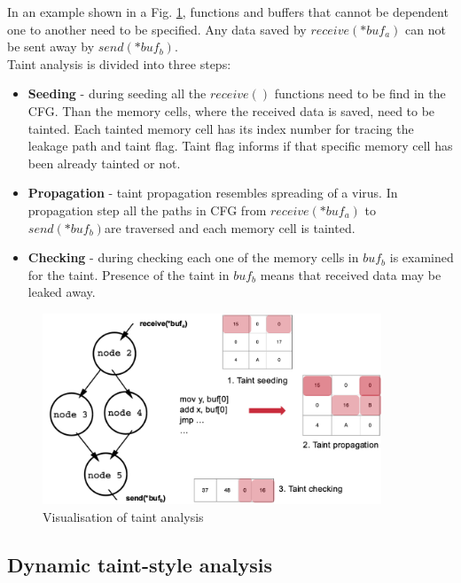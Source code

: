 \documentclass[a4paper, 12pt, journal, onecolumn]{IEEEtran}
\begin{document}
In an example shown in a Fig. \ref{fig:taint}, functions and buffers that cannot be dependent one to another need to be specified. Any data saved by $receive(*buf_a)$ can not be sent away by $send(*buf_b)$. 
\\

Taint analysis is divided into three steps:\\
\begin{itemize}
\item \textbf{Seeding} - during seeding all the $receive()$ functions need to be find in the CFG. Than the memory cells, where the received data is saved, need to be tainted. Each tainted memory cell has its index number for tracing the leakage path and taint flag. Taint flag informs if that specific memory cell has been already tainted or not.\\
\item \textbf{Propagation} - taint propagation resembles spreading of a virus. In propagation step all the paths in CFG from $receive(*buf_a)$ to $send(*buf_b)$are traversed and each memory cell is tainted.\\
\item \textbf{Checking} - during checking each one of the memory cells in $buf_b$ is examined for the taint. Presence of the taint in $buf_b$ means that received data may be leaked away.\\
\end{itemize}

\begin{figure}[ht]
    \centering
    \captionsetup{justification=centering}
    \includegraphics[width=0.9\textwidth]{Taint.png}
    \caption{Visualisation of taint analysis}
    \label{fig:taint}
\end{figure}

\subsection{Dynamic taint-style analysis}
\end{document}

